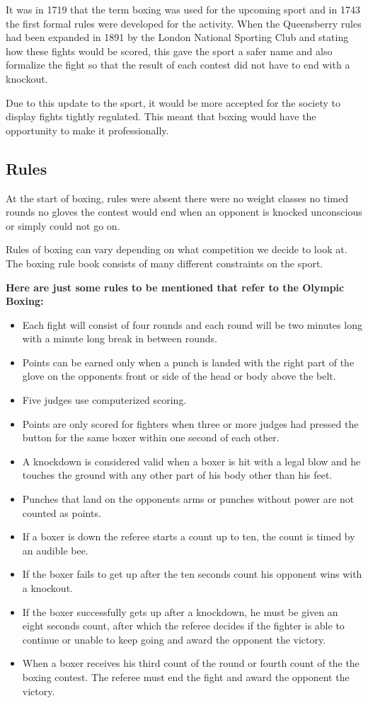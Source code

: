 \documentclass[a4paper,12pt]{report}
\begin{document}
It was in 1719 that the term boxing was used for the upcoming sport and in 1743 the first formal rules were developed for the activity. When the Queensberry rules had been expanded in 1891 by the London National Sporting Club and stating how these fights would be scored, this gave the sport a safer name and also formalize the fight so that the result of each contest did not have to end with a knockout.\cite{modernBoxing}

Due to this update to the sport, it would be more accepted for the society to display fights tightly regulated. This meant that boxing would have the opportunity to make it professionally.  

\subsection{Rules}
At the start of boxing, rules were absent there were no weight classes no timed rounds no gloves the contest would end when an opponent is knocked unconscious or simply could not go on.

Rules of boxing can vary depending on what competition we decide to look at. The boxing rule book consists of many different constraints on the sport.

\textbf{Here are just some rules to be mentioned that refer to the Olympic Boxing:}
\begin{itemize}
    \item Each fight will consist of four rounds and each round will be two minutes long with a minute long break in between rounds.
    \item Points can be earned only when a punch is landed with the right part of the glove on the opponents front or side of the head or body above the belt.
    \item Five judges use computerized scoring.
    \item Points are only scored for fighters when three or more judges had pressed the button for the same boxer within one second of each other.
    \item A knockdown is considered valid when a boxer is hit with a legal blow and he touches the ground with any other part of his body other than his feet.
    \item Punches  that land on the opponents arms or punches without power are not counted as points.
    \item If a boxer is down the referee starts a count up to ten, the count is timed by an audible bee.
    \item If the boxer fails to get up after the ten seconds count his opponent wins with a knockout.
    \item If the boxer successfully gets up after a knockdown, he must be given an eight seconds count, after which the referee decides if the fighter is able to continue or unable to keep going and award the opponent the victory.
    \item When a boxer receives his third count of the round or fourth count of the the boxing contest. The referee must end the fight and award the opponent the victory.
    \cite{lewandowski2012olympic}
\end{itemize}
\end{document}

